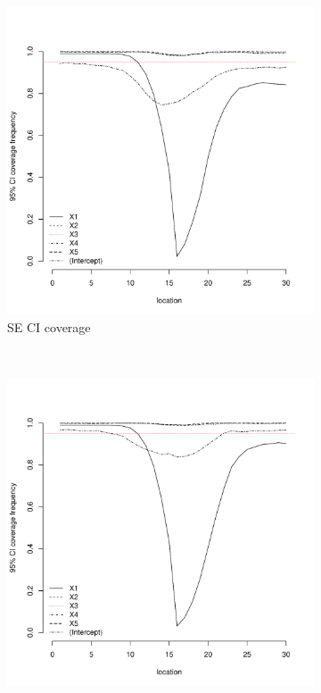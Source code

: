 \documentclass[authoryear, review, 11pt]{elsarticle}
\begin{document}
\begin{figure}
\begin{subfigure}[b]{0.45\textwidth}
		\includegraphics[width=\textwidth]{../../figures/simulation/15.1.profile_se_coverage.pdf}
		\caption{SE CI coverage}
	\end{subfigure}%
	\\%
	\begin{subfigure}[b]{0.45\textwidth}
	\centering
		\includegraphics[width=\textwidth]{../../figures/simulation/15.1.profile_unshrunk_bootstrap_coverage.pdf}

\end{subfigure}
\end{figure}
\end{document}
